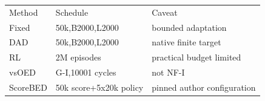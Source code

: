 \begin{tabular}{lll}Method & Schedule & Caveat \\ Fixed & 50k,B2000,L2000 & bounded adaptation \\ DAD & 50k,B2000,L2000 & native finite target \\ RL & 2M episodes & practical budget limited \\ vsOED & G-I,10001 cycles & not NF-I \\ ScoreBED & 50k score+5x20k policy & pinned author configuration \\ \end{tabular}
